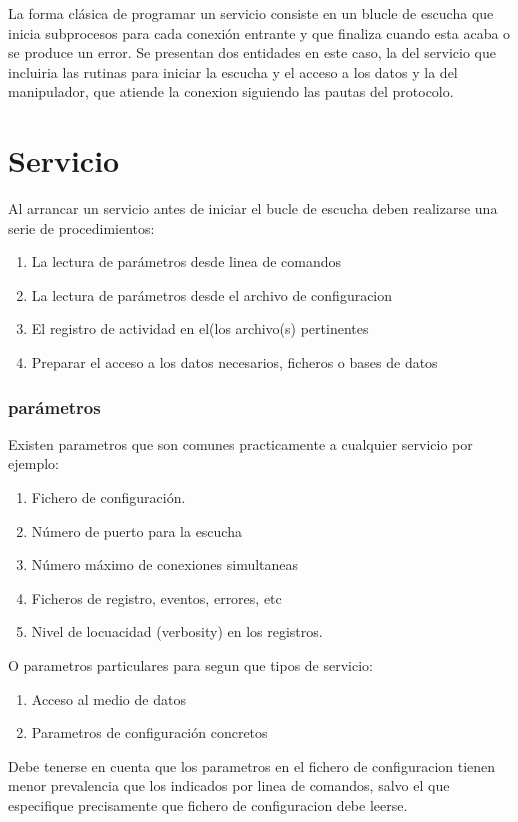 \documentclass[a4paper,spanish,12pt]{book}
\begin{document}
La forma cl\'asica de programar un servicio consiste en un blucle de escucha que inicia subprocesos para cada conexi\'on entrante y que finaliza cuando esta acaba o se produce un error. Se presentan dos entidades en este caso, la del servicio que incluiria las rutinas para iniciar la escucha y el acceso a los datos y la del manipulador, que atiende la conexion siguiendo las pautas del protocolo.
\section{Servicio}
Al arrancar un servicio antes de iniciar el bucle de escucha deben realizarse una serie de procedimientos:
\begin{enumerate}
	\item La lectura de parámetros desde linea de comandos
	\item La lectura de parámetros desde el archivo de configuracion
	\item El registro de actividad en el(los archivo(s) pertinentes
	\item Preparar el acceso a los datos necesarios, ficheros o bases de datos
\end{enumerate}

\subsubsection{parámetros}
Existen parametros que son comunes practicamente a cualquier servicio por ejemplo:
\begin{enumerate}
	\item Fichero de configuraci\'on.
	\item N\'umero de puerto para la escucha
	\item N\'umero m\'aximo de conexiones simultaneas
	\item Ficheros de registro, eventos, errores, etc
	\item Nivel de locuacidad (verbosity) en los registros.
\end{enumerate}
O parametros particulares para segun que tipos de servicio:
\begin{enumerate}
	\item Acceso al medio de datos
	\item Parametros de configuraci\'on concretos
\end{enumerate}
Debe tenerse en cuenta que los parametros en el fichero de configuracion tienen menor prevalencia que los indicados por linea de comandos, salvo el que especifique precisamente que fichero de configuracion debe leerse.
\end{document}
